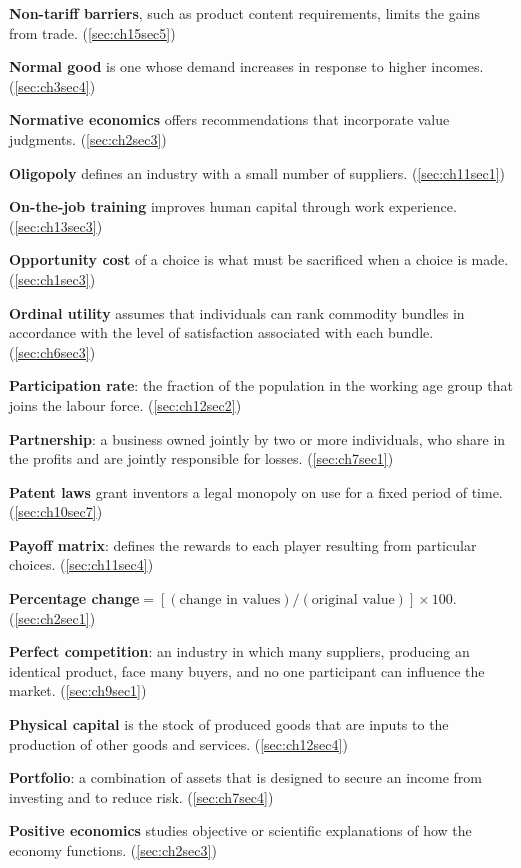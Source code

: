 \textbf{Non-tariff barriers}, such as product content requirements, limits the gains from trade. (\ref{sec:ch15sec5})

\textbf{Normal good} is one whose demand increases in response to higher incomes. (\ref{sec:ch3sec4})

\textbf{Normative economics} offers recommendations that incorporate value judgments. (\ref{sec:ch2sec3})

\textbf{Oligopoly} defines an industry with a small number of suppliers. (\ref{sec:ch11sec1})

\textbf{On-the-job training} improves human capital through work experience. (\ref{sec:ch13sec3})

\textbf{Opportunity cost} of a choice is what must be sacrificed when a choice is made. (\ref{sec:ch1sec3})

\textbf{Ordinal utility} assumes that individuals can rank commodity bundles in accordance with the level of satisfaction associated with each bundle. (\ref{sec:ch6sec3})

\textbf{Participation rate}: the fraction of the population in the working age group that joins the labour force. (\ref{sec:ch12sec2})

\textbf{Partnership}: a business owned jointly by two or more individuals, who share in the profits and are jointly responsible for losses. (\ref{sec:ch7sec1})

\textbf{Patent laws} grant inventors a legal monopoly on use for a fixed period of time. (\ref{sec:ch10sec7})

\textbf{Payoff matrix}: defines the rewards to each player resulting from particular choices. (\ref{sec:ch11sec4})

\textbf{Percentage change}$=[(\text{change in values})/(\text{original value})]\times 100$. (\ref{sec:ch2sec1})

\textbf{Perfect competition}: an industry in which many suppliers, producing an identical product, face many buyers, and no one participant can influence the market. (\ref{sec:ch9sec1})

\textbf{Physical capital} is the stock of produced goods that are inputs to the production of other goods and services. (\ref{sec:ch12sec4})

\textbf{Portfolio}: a combination of assets that is designed to secure an income from investing and to reduce risk. (\ref{sec:ch7sec4})

\textbf{Positive economics} studies objective or scientific explanations of how the economy functions. (\ref{sec:ch2sec3})

